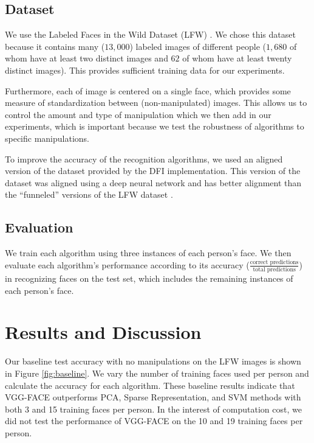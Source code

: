 \documentclass[pageno]{cos429}
\begin{document}
\subsection{Dataset}
We use the Labeled Faces in the Wild Dataset (LFW) \cite{huang_labeled_2007}. We chose this dataset because it contains many ($13,000$) labeled images of different people ($1,680$ of whom have at least two distinct images and $62$ of whom have at least twenty distinct images). This provides sufficient training data for our experiments.

Furthermore, each of image is centered on a single face, which provides some measure of standardization between (non-manipulated) images. This allows us to control the amount and type of manipulation which we then add in our experiments, which is important because we test the robustness of algorithms to specific manipulations.

To improve the accuracy of the recognition algorithms, we used an aligned version of the dataset provided by the DFI implementation. This version of the dataset was aligned using a deep neural network and has better alignment than the ``funneled'' versions of the LFW dataset \cite{noauthor_lfw_nodate}.

\subsection{Evaluation}
We train each algorithm using three instances of each person's face. We then evaluate each algorithm's performance according to its accuracy ($\frac{\textrm{correct predictions}}{\textrm{total predictions}}$) in recognizing faces on the test set, which includes the remaining instances of each person's face.

\section{Results and Discussion}
Our baseline test accuracy with no manipulations on the LFW images is shown in Figure \ref{fig:baseline}. We vary the number of training faces used per person and calculate the accuracy for each algorithm. These baseline results indicate that VGG-FACE outperforms PCA, Sparse Representation, and SVM methods with both 3 and 15 training faces per person. In the interest of computation cost, we did not test the performance of VGG-FACE on the 10 and 19 training faces per person.
\end{document}
